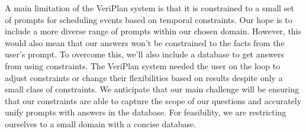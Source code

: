 \documentclass{article}
\begin{document}
A main limitation of the VeriPlan system is that it is constrained to a small set of prompts for scheduling events based on temporal constraints.  Our hope is to include a more diverse range of prompts within our chosen domain.  However, this would also mean that our answers won’t be constrained to the facts from the user’s prompt.  To overcome this, we’ll also include a database to get answers from using constraints.  The VeriPlan system needed the user on the loop to adjust constraints or change their flexibilities based on results despite only a small class of constraints.  We anticipate that our main challenge will be ensuring that our constraints are able to capture the scope of our questions and accurately unify prompts with answers in the database.  For feasibility, we are restricting ourselves to a small domain with a concise database.








\end{document}

